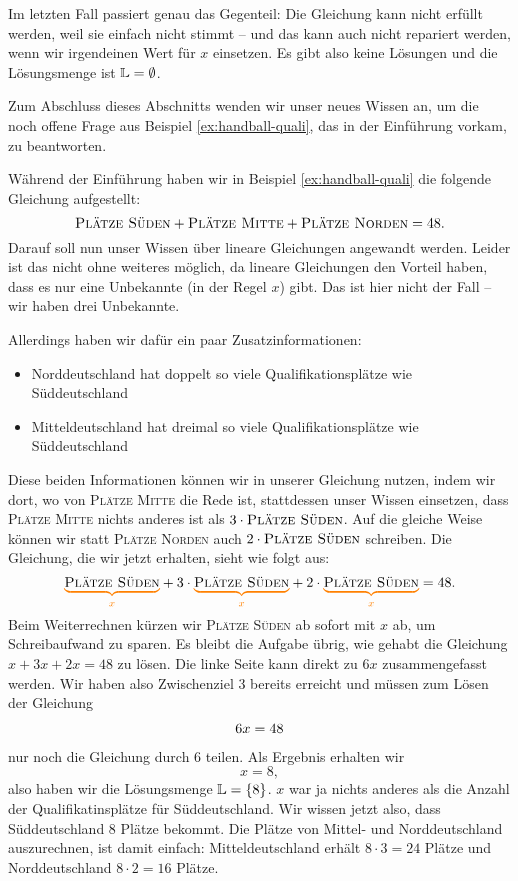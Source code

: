 \documentclass[../../main.tex]{subfiles}
\begin{document}
Im letzten Fall passiert genau das Gegenteil: Die Gleichung kann nicht erfüllt werden, weil sie einfach nicht stimmt -- und das kann auch nicht repariert werden, wenn wir irgendeinen Wert für $x$ einsetzen. Es gibt also keine Lösungen und die Lösungsmenge ist $\mathbb{L}=\emptyset$.

Zum Abschluss dieses Abschnitts wenden wir unser neues Wissen an, um die noch offene Frage aus Beispiel \ref{ex:handball-quali}, das in der Einführung vorkam, zu beantworten.
\begin{example}{}
    Während der Einführung haben wir in Beispiel \ref{ex:handball-quali} die folgende Gleichung aufgestellt: 
    \[\textsc{Plätze Süden}+\textsc{Plätze Mitte}+\textsc{Plätze Norden}=48.\]
    Darauf soll nun unser Wissen über lineare Gleichungen angewandt werden. Leider ist das nicht ohne weiteres möglich, da lineare Gleichungen den Vorteil haben, dass es nur eine Unbekannte (in der Regel $x$) gibt. Das ist hier nicht der Fall -- wir haben drei Unbekannte.
    
    Allerdings haben wir dafür ein paar Zusatzinformationen:
    \begin{itemize}
        \item Norddeutschland hat doppelt so viele Qualifikationsplätze wie Süddeutschland
        \item Mitteldeutschland hat dreimal so viele Qualifikationsplätze wie Süddeutschland
    \end{itemize}
    Diese beiden Informationen können wir in unserer Gleichung nutzen, indem wir dort, wo von \textsc{Plätze Mitte} die Rede ist, stattdessen unser Wissen einsetzen, dass \textsc{Plätze Mitte} nichts anderes ist als $3\cdot \textsc{Plätze Süden}$. Auf die gleiche Weise können wir statt \textsc{Plätze Norden} auch $2\cdot \textsc{Plätze Süden}$ schreiben. Die Gleichung, die wir jetzt erhalten, sieht wie folgt aus:
    \[\colorbrace{\textsc{Plätze Süden}}{x}+3\cdot \colorbrace{\textsc{Plätze Süden}}{x}+2\cdot \colorbrace{\textsc{Plätze Süden}}{x}=48.\]
    Beim Weiterrechnen kürzen wir \textsc{Plätze Süden} ab sofort mit $x$ ab, um Schreibaufwand zu sparen. Es bleibt die Aufgabe übrig, wie gehabt die Gleichung $x+3x+2x=48$ zu lösen. Die linke Seite kann direkt zu $6x$ zusammengefasst werden. Wir haben also Zwischenziel 3 bereits erreicht und müssen zum Lösen der Gleichung
    \[6x=48 \commentLine{:6}\]
    nur noch die Gleichung durch $6$ teilen. Als Ergebnis erhalten wir
    \[x=8,\]
    also haben wir die Lösungsmenge $\mathbb{L}=\{8\}$. $x$ war ja nichts anderes als die Anzahl der Qualifikatinsplätze für Süddeutschland. Wir wissen jetzt also, dass Süddeutschland $8$ Plätze bekommt. Die Plätze von Mittel- und Norddeutschland auszurechnen, ist damit einfach: Mitteldeutschland erhält $8\cdot 3=24$ Plätze und Norddeutschland $8\cdot 2=16$ Plätze.
\end{example}
\end{document}
